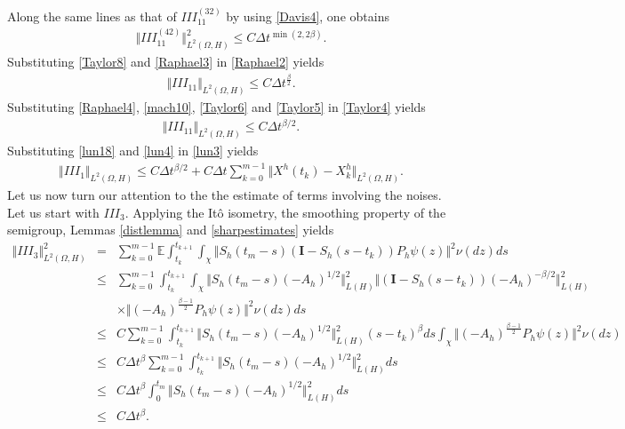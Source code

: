 \documentclass[review,12pt]{elsarticle}
\begin{document}
Along the same lines as that of $III_{11}^{(32)}$ by using \eqref{Davis4}, one obtains 
\begin{eqnarray}
\label{Raphael3}
\Vert III_{11}^{(42)}\Vert^2_{L^2(\Omega, H)}\leq C\Delta t^{\min(2, 2\beta)}.
\end{eqnarray}
Substituting \eqref{Taylor8} and \eqref{Raphael3} in \eqref{Raphael2} yields
\begin{eqnarray}
\label{Raphael4}
\Vert III_{11}\Vert_{L^2(\Omega, H)}\leq C\Delta t^{\frac{\beta}{2}}.
\end{eqnarray}
Substituting \eqref{Raphael4}, \eqref{mach10}, \eqref{Taylor6} and \eqref{Taylor5} in \eqref{Taylor4} yields
\begin{eqnarray}
\label{lun18}
\Vert III_{11}\Vert_{L^2(\Omega, H)}\leq C\Delta t^{\beta/2}.
\end{eqnarray}
Substituting \eqref{lun18} and \eqref{lun4} in \eqref{lun3} yields 
\begin{eqnarray}
\label{lun19}
\Vert III_1\Vert_{L^2(\Omega, H)}\leq C\Delta t^{\beta/2}+C\Delta t\sum_{k=0}^{m-1}\Vert X^h(t_k)-X^h_k\Vert_{L^2(\Omega, H)}.
\end{eqnarray}
Let us now turn our attention to the the estimate of terms involving the noises. Let us start with $III_3$. Applying the It\^{o} isometry, the smoothing property of the semigroup, Lemmas \ref{distlemma} and \ref{sharpestimates} yields
\begin{eqnarray}
\label{lun20}
\Vert III_3\Vert^2_{L^2(\Omega, H)}&=&\sum_{k=0}^{m-1}\mathbb{E}\int_{t_k}^{t_{k+1}}\int_{\chi}\Vert S_h(t_m-s)\left(\mathbf{I}-S_h(s-t_k)\right)P_h\psi(z)\Vert^2\nu(dz)ds\nonumber\\
&\leq&\sum_{k=0}^{m-1}\int_{t_k}^{t_{k+1}}\int_{\chi}\Vert S_h(t_m-s)(-A_h)^{1/2}\Vert^2_{L(H)}\Vert\left(\mathbf{I}-S_h(s-t_k)\right)(-A_h)^{-\beta/2}\Vert^2_{L(H)}\nonumber\\
&&\times\Vert (-A_h)^{\frac{\beta-1}{2}}P_h\psi(z)\Vert^2\nu(dz)ds\nonumber\\
&\leq& C\sum_{k=0}^{m-1}\int_{t_k}^{t_{k+1}}\Vert S_h(t_m-s)(-A_h)^{1/2}\Vert^2_{L(H)}(s-t_k)^{\beta}ds\int_{\chi} \Vert (-A_h)^{\frac{\beta-1}{2}}P_h\psi(z)\Vert^2\nu(dz)\nonumber\\
&\leq& C\Delta t^{\beta}\sum_{k=0}^{m-1}\int_{t_k}^{t_{k+1}}\Vert S_h(t_m-s)(-A_h)^{1/2}\Vert^2_{L(H)}ds\nonumber\\
&\leq& C\Delta t^{\beta}\int_0^{t_m}\Vert S_h(t_m-s)(-A_h)^{1/2}\Vert^2_{L(H)}ds\nonumber\\
&\leq& C\Delta t^{\beta}.
\end{eqnarray}
\end{document}

